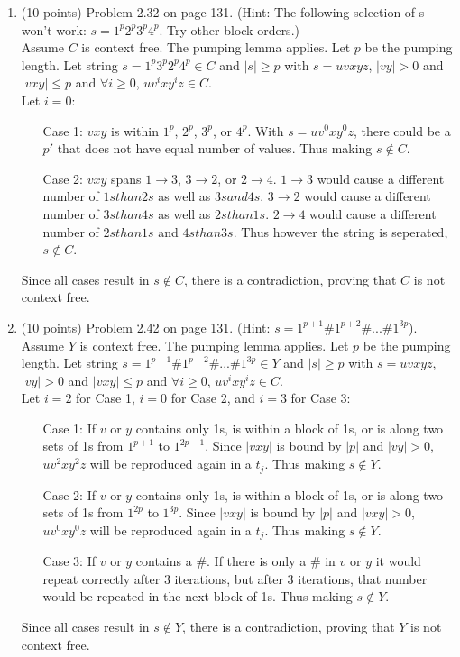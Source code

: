 \documentclass[11pt]{article}
\begin{document}
\begin{enumerate}
 \item (10 points) Problem 2.32 on page 131. (Hint: The following selection of s won't work: $s=1^p2^p3^p4^p$. Try other block orders.) \\
      Assume $C$ is context free. The pumping lemma applies. Let $p$ be the pumping length. Let string $s = 1^p3^p2^p4^p \in C$
	and $|s| \geq p$ with $s= uvxyz$, $|vy| > 0$ and $|vxy| \leq p$ and $\forall i \geq 0$, $uv^ixy^iz \in C$. \\
	Let $i = 0$:
	\begin{itemize}
	 \item[Case 1:] $vxy$ is within $1^p$, $2^p$, $3^p$, or $4^p$. With $s = uv^0xy^0z$, there could be a $p'$ that does not have 
	      equal number of values. Thus making $s \notin C$.
	 \item[Case 2:] $vxy$ spans $1 \to 3$, $3 \to 2$, or $2 \to 4$. $1 \to 3$ would cause a different number of $1s than 2s$ as well as
	      $3s and 4s$. $3 \to 2$ would cause a different number of $3s than 4s$ as well as $2s than 1s$. $2 \to 4$ would cause a different
	      number of $2s than 1s$ and $4s than 3s$. Thus however the string is seperated, $s \notin C$.
	\end{itemize}
	Since all cases result in $s \notin C$, there is a contradiction, proving that $C$ is not context free.
	
 \item (10 points) Problem 2.42 on page 131. (Hint: $s=1^{p+1}\#1^{p+2}\#...\#1^{3p}$). \\
        Assume $Y$ is context free. The pumping lemma applies. Let $p$ be the pumping length. Let string $s = 1^{p+1}\#1^{p+2}\#...\#1^{3p}
        \in Y$ 	and $|s| \geq p$ with $s= uvxyz$, $|vy| > 0$ and $|vxy| \leq p$ and $\forall i \geq 0$, $uv^ixy^iz \in C$. \\
        Let $i = 2$ for Case 1, $i=0$ for Case 2, and $i = 3$ for Case 3:
	\begin{itemize}
	 \item[Case 1:] If $v$ or $y$ contains only 1s, is within a block of 1s, or is along two sets of 1s from $1^{p+1}$ to $1^{2p-1}$.
			Since $|vxy|$ is bound by $|p|$ and $|vy| > 0$, $uv^2xy^2z$ will be reproduced again in a $t_j$. Thus making $s \notin Y$.
	 \item[Case 2:] If $v$ or $y$ contains only 1s, is within a block of 1s, or is along two sets of 1s from $1^{2p}$ to $1^{3p}$.
			Since $|vxy|$ is bound by $|p|$ and $|vxy| > 0$, $uv^0xy^0z$ will be reproduced again in a $t_j$. Thus making $s \notin Y$.
	 \item[Case 3:] If $v$ or $y$ contains a $\#$. If there is only a $\#$ in $v$ or $y$ it would repeat correctly after 3 iterations,
			but after 3 iterations, that number would be repeated in the next block of 1s. Thus making $s \notin Y$.
	\end{itemize}
	Since all cases result in $s \notin Y$, there is a contradiction, proving that $Y$ is not context free.
 
\end{enumerate}
\end{document}
